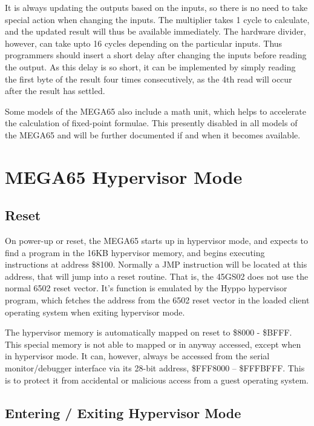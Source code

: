 It is always updating the outputs based on the inputs, so there is no need to take special action when changing the inputs.
The multiplier takes 1 cycle to calculate, and the updated result will thus be available immediately. The hardware divider,
however, can take upto 16 cycles depending on the particular inputs.  Thus programmers should insert a short delay after
changing the inputs before reading the output.  As this delay is so short, it can be implemented by simply reading the first
byte of the result four times consecutively, as the 4th read will occur after the result has settled.

Some models of the MEGA65 also include a math unit, which helps to accelerate the calculation of fixed-point formulae.
This presently disabled in all models of the MEGA65 and will be further documented if and when it becomes
available.



\section{MEGA65 Hypervisor Mode}
\label{sec:hypervisor-mode}

\subsection{Reset}

On power-up or reset, the MEGA65 starts up in hypervisor mode, and expects to find a program in the
16KB hypervisor memory, and begins executing instructions at address \$8100.  Normally a JMP instruction
will be located at this address, that will jump into a reset routine. That is, the 45GS02
does not use the normal 6502 reset vector. It's function is emulated by the Hyppo hypervisor program,
which fetches the address from the 6502 reset vector in the loaded client operating system when
exiting hypervisor mode.

The hypervisor memory is automatically mapped on reset to \$8000 - \$BFFF.  This special memory is not
able to mapped or in anyway accessed, except when in hypervisor mode. It can, however, always be accessed from the serial monitor/debugger
interface via its 28-bit address, \$FFF8000 -- \$FFFBFFF.  This is to protect it from accidental or malicious access from a guest operating system.

\subsection{Entering / Exiting Hypervisor Mode}

